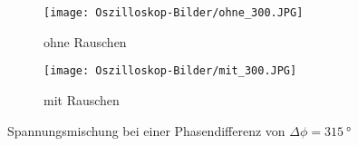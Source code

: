 \begin{figure}
	\begin{subfigure}{0.5\textwidth}
		\texttt{[image: Oszilloskop-Bilder/ohne\_300.JPG]}
		\caption{ohne Rauschen}
	\end{subfigure}
	\begin{subfigure}{0.5\textwidth}
		\texttt{[image: Oszilloskop-Bilder/mit\_300.JPG]}
		\caption{mit Rauschen}
	\end{subfigure}
\caption{Spannungsmischung bei einer Phasendifferenz von $\Delta\phi = \SI{315}{\degree}$}
\label{Verschiebung_315}
\end{figure}